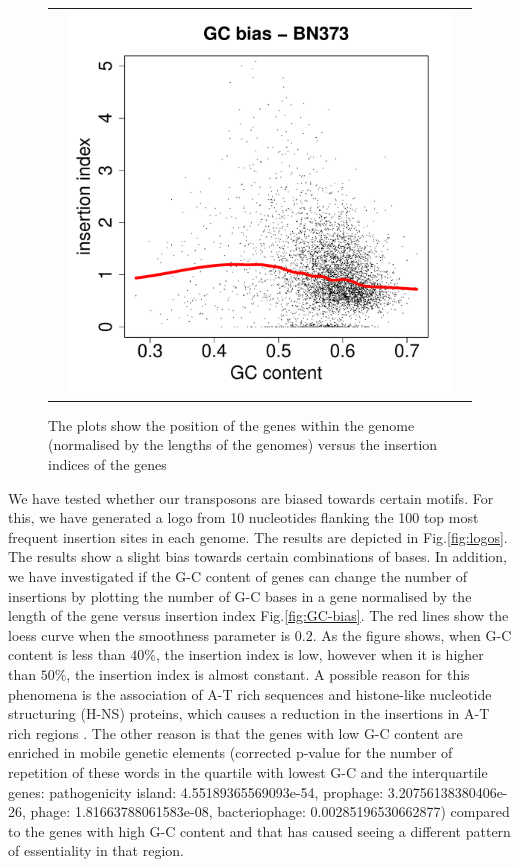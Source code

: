 \documentclass[12pt,letterpaper]{article}
\begin{document}
\begin{figure}
\begin{tabular}{c c c}
&\includegraphics[page=38, scale=0.25]{biases.pdf}&\\
\end{tabular}
\caption{The plots show the position of the genes within the genome (normalised by the lengths of the genomes) versus the insertion indices of the genes}
\label{fig:distance-bias}
\end{figure}

We have tested whether our transposons are biased towards certain motifs. For this, we have generated a logo from 10 nucleotides flanking the 100 top most frequent insertion sites in each genome. The results are depicted in Fig.\@  \ref{fig:logos}. The results show a slight bias towards certain combinations of bases. In addition, we have investigated if the G-C content of genes can change the number of insertions by plotting the number of G-C bases in a gene normalised by the length of the gene versus insertion index Fig.\@  \ref{fig:GC-bias}. The red lines show the loess curve when the smoothness parameter is $0.2$. As the figure shows, when G-C content is less than $40\%$, the insertion index is low, however when it is higher than $50\%$, the insertion index is almost constant. A possible reason for this phenomena is the association of A-T rich sequences and histone-like nucleotide structuring (H-NS) proteins, which causes a reduction in the insertions in A-T rich regions \cite{kimura_nucleoid_2016}. The other reason is that the genes with low G-C content are enriched in mobile genetic elements (corrected p-value for the number of repetition of these words in the quartile with lowest G-C and the interquartile genes: pathogenicity island: 4.55189365569093e-54, prophage: 3.20756138380406e-26, phage: 1.81663788061583e-08, bacteriophage: 0.00285196530662877) compared to the genes with high G-C content and that has caused seeing a different pattern of essentiality in that region.
\end{document}
